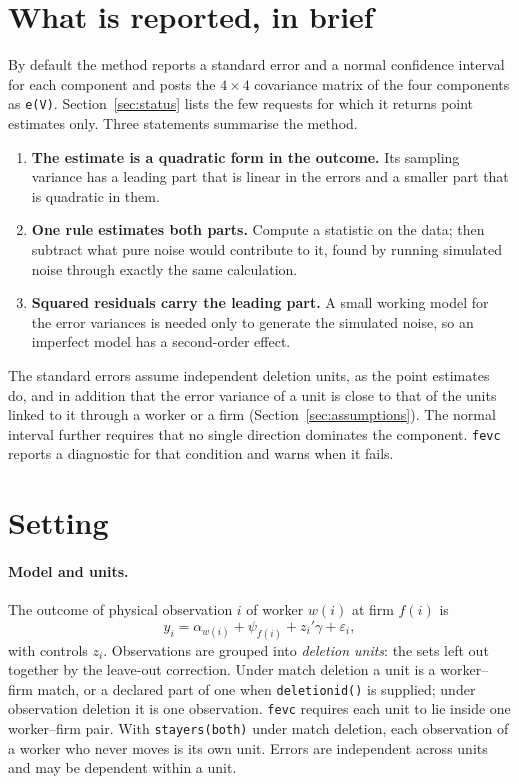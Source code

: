 \documentclass[11pt]{article}
\newcommand{\fevc}{\texttt{fevc}}
\begin{document}
\section{What is reported, in brief}\label{sec:brief}

By default the method reports a standard error and a normal confidence
interval for each component and posts the $4\times4$ covariance matrix of
the four components as \texttt{e(V)}. Section~\ref{sec:status} lists the
few requests for which it returns point estimates only. Three statements
summarise the method.

\begin{enumerate}
\item \textbf{The estimate is a quadratic form in the outcome.} Its sampling
variance has a leading part that is linear in the errors and a smaller part
that is quadratic in them.
\item \textbf{One rule estimates both parts.} Compute a statistic on the data;
then subtract what pure noise would contribute to it, found by running
simulated noise through exactly the same calculation.
\item \textbf{Squared residuals carry the leading part.} A small working model
for the error variances is needed only to generate the simulated noise, so
an imperfect model has a second-order effect.
\end{enumerate}

The standard errors assume independent deletion units, as the point estimates
do, and in addition that the error variance of a unit is close to that of the
units linked to it through a worker or a firm (Section~\ref{sec:assumptions}).
The normal interval further requires that no single direction dominates the
component. \fevc{} reports a diagnostic for that condition and warns when it
fails.

\section{Setting}\label{sec:setting}

\paragraph{Model and units.} The outcome of physical observation $i$ of
worker $w(i)$ at firm $f(i)$ is
\[
 y_i=\alpha_{w(i)}+\psi_{f(i)}+z_i'\gamma+\varepsilon_i ,
\]
with controls $z_i$. Observations are grouped into \emph{deletion units}:
the sets left out together by the leave-out correction. Under match deletion
a unit is a worker--firm match, or a declared part of one when
\texttt{deletionid()} is supplied; under observation deletion it is one
observation. \fevc{} requires each unit to lie inside one worker--firm pair.
With \texttt{stayers(both)} under match deletion, each observation of a worker
who never moves is its own unit. Errors are independent across units and may
be dependent within a unit.
\end{document}
